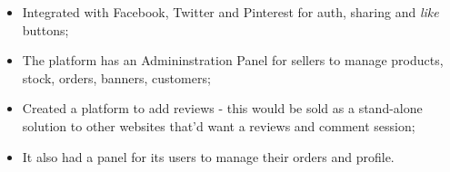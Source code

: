 \begin{experiences}
{\begin{itemize}
            \item Integrated with Facebook, Twitter and Pinterest for auth, sharing and \emph{like} buttons;
            \item The platform has an Admininstration Panel for sellers to manage products, stock, orders, banners, customers; 
            \item Created a platform to add reviews - this would be sold as a stand-alone solution to other websites that'd want a reviews and comment session;
            \item It also had a panel for its users to manage their orders and profile.\\ 
          \end{itemize}
        }{}
\end{experiences}
